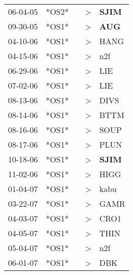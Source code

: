 \begin{supertabular}{p{0.07\textwidth}p{0.06\textwidth}p{0.02\textwidth}p{0.02\textwidth}p{0.06\textwidth}}
          06-04-05\textsuperscript{} &  *OS2* &   &     \textgreater &  \textbf{SJIM\textsuperscript{}} \\
          09-30-05\textsuperscript{} &  *OS1* &   &     \textgreater &   \textbf{AUG\textsuperscript{}} \\
          04-10-06\textsuperscript{} &  *OS1* &   &     \textgreater &           HANG\textsuperscript{} \\
          04-15-06\textsuperscript{} &  *OS1* &   &     \textgreater &            n2f\textsuperscript{} \\
          06-29-06\textsuperscript{} &  *OS1* &   &     \textgreater &            LIE\textsuperscript{} \\
          07-02-06\textsuperscript{} &  *OS1* &   &     \textgreater &            LIE\textsuperscript{} \\
          08-13-06\textsuperscript{} &  *OS1* &   &     \textgreater &           DIVS\textsuperscript{} \\
          08-14-06\textsuperscript{} &  *OS1* &   &     \textgreater &           BTTM\textsuperscript{} \\
          08-16-06\textsuperscript{} &  *OS1* &   &     \textgreater &           SOUP\textsuperscript{} \\
          08-17-06\textsuperscript{} &  *OS1* &   &     \textgreater &           PLUN\textsuperscript{} \\
          10-18-06\textsuperscript{} &  *OS1* &   &     \textgreater &  \textbf{SJIM\textsuperscript{}} \\
          11-02-06\textsuperscript{} &  *OS1* &   &     \textgreater &           HIGG\textsuperscript{} \\
          01-04-07\textsuperscript{} &  *OS1* &   &     \textgreater &           kabu\textsuperscript{} \\
          03-22-07\textsuperscript{} &  *OS1* &   &     \textgreater &           GAMR\textsuperscript{} \\
          04-03-07\textsuperscript{} &  *OS1* &   &     \textgreater &           CRO1\textsuperscript{} \\
          04-05-07\textsuperscript{} &  *OS1* &   &     \textgreater &           THIN\textsuperscript{} \\
          05-04-07\textsuperscript{} &  *OS1* &   &     \textgreater &            n2f\textsuperscript{} \\
          06-01-07\textsuperscript{} &  *OS1* &   &     \textgreater &            DBK\textsuperscript{} \\

\end{supertabular}
